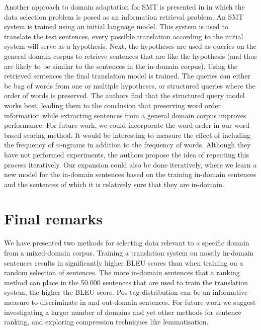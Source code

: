 \documentclass[11pt]{article}
\begin{document}
Another approach to domain adaptation for SMT is presented in \cite{query} in which the data selection problem is posed as an information retrieval problem. An SMT system is trained using an initial language model. This system is used to translate the test sentences, every possible translation according to the initial system will serve as a hypothesis. Next, the hypotheses are used as queries on the general domain corpus to retrieve sentences that are like the hypothesis (and thus are likely to be similar to the sentences in the in-domain corpus). Using the retrieved sentences the final translation model is trained. The queries can either be bag of words from one or multiple hypotheses, or structured queries where the order of words is preserved. The authors find that the structured query model works best, leading them to the conclusion that preserving word order information while extracting sentences from a general domain corpus improves performance. For future work, we could incorporate the word order in our word-based scoring method. It would be interesting to measure the effect of including the frequency of $n$-ngrams in addition to the frequency of words. Although they have not performed experiments, the authors propose the idea of repeating this process iteratively. Our expansion could also be done iteratively, where we learn a new model for the in-domain sentences based on the training in-domain sentences and the sentences of which it is relatively sure that they are in-domain.


\section{Final remarks}
\label{sec:conclusion}
We have presented two methods for selecting data relevant to a specific domain from a mixed-domain corpus. Training a translation system on mostly in-domain sentences results in significantly higher BLEU scores than when training on a random selection of sentences. The more in-domain sentences that a ranking method can place in the 50.000 sentences that are used to train the translation system, the higher the BLEU score. Pos-tag distribution can be an informative measure to discriminate in and out-domain sentences. For future work we suggest investigating a larger number of domains and yet other methods for sentence ranking, and exploring compression techniques like lemmatisation.  
\end{document}
